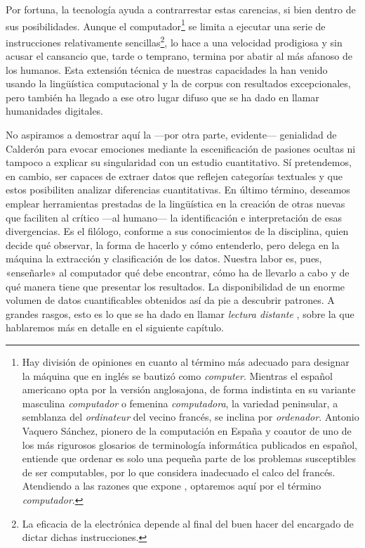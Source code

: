 Por fortuna, la tecnología ayuda a contrarrestar estas carencias, si bien dentro de sus posibilidades. Aunque el computador\footnote{Hay división de opiniones en cuanto al término más adecuado para designar la máquina que en inglés se bautizó como \textit{computer}. Mientras el español americano opta por la versión anglosajona, de forma indistinta en su variante masculina \textit{computador} o femenina \textit{computadora}, la variedad peninsular, a semblanza del \textit{ordinateur} del vecino francés, se inclina por \textit{ordenador}. Antonio Vaquero Sánchez, pionero de la computación en España y coautor de uno de los más rigurosos glosarios de terminología informática publicados \parencite{vaquero1985} en español, entiende que ordenar es solo una pequeña parte de los problemas susceptibles de ser computables, por lo que considera inadecuado el calco del francés. Atendiendo a las razones que expone \parencite[9-11]{vaquero1999}, optaremos aquí por el término \textit{computador}.} se limita a ejecutar una serie de instrucciones relativamente sencillas\footnote{La eficacia de la electrónica depende al final del buen hacer del encargado de dictar dichas instrucciones.}, lo hace a una velocidad prodigiosa y sin acusar el cansancio que, tarde o temprano, termina por abatir al más afanoso de los humanos. Esta extensión técnica de nuestras capacidades la han venido usando la lingüística computacional y la de corpus con resultados excepcionales, pero también ha llegado a ese otro lugar difuso que se ha dado en llamar humanidades digitales.

No aspiramos a demostrar aquí la —por otra parte, evidente— genialidad de Calderón para evocar emociones mediante la escenificación de pasiones ocultas \parencite[451]{bidwell2013} ni tampoco a explicar su singularidad con un estudio cuantitativo. Sí pretendemos, en cambio, ser capaces de extraer datos que reflejen categorías textuales y que estos posibiliten analizar diferencias cuantitativas. En último término, deseamos emplear herramientas prestadas de la lingüística en la creación de otras nuevas que faciliten al crítico —\nolinebreak al humano\nolinebreak— la identificación e interpretación de esas divergencias. Es el filólogo, conforme a sus conocimientos de la disciplina, quien decide qué observar, la forma de hacerlo y cómo entenderlo, pero delega en la máquina la extracción y clasificación de los datos. Nuestra labor es, pues, «enseñarle» al computador qué debe encontrar, cómo ha de llevarlo a cabo y de qué manera tiene que presentar los resultados. La disponibilidad de un enorme volumen de datos cuantificables obtenidos así da pie a descubrir patrones. A grandes rasgos, esto es lo que se ha dado en llamar \textit{lectura distante} \parencite{moretti2000}, sobre la que hablaremos más en detalle en el siguiente capítulo.

